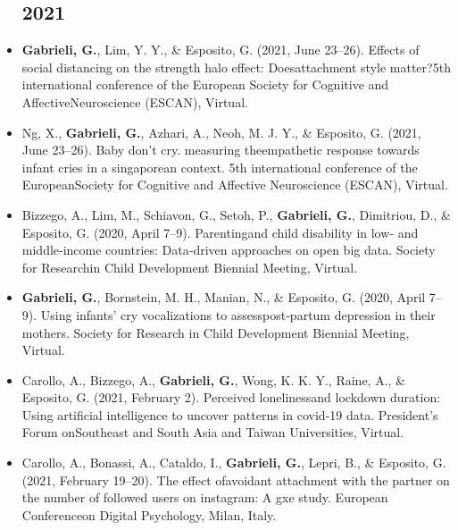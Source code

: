 \documentclass[10pt,a4paper]{altacv}
\begin{document}
\begin{fullwidth}
\begin{itemize}
\subsection*{2021}
\item  \textbf{Gabrieli, G.}, Lim, Y. Y., \& Esposito, G. (2021, June 23–26). Effects of social distancing on the strength halo effect: Doesattachment style matter?5th international conference of the European Society for Cognitive and AffectiveNeuroscience (ESCAN), Virtual.
 \item Ng, X., \textbf{Gabrieli, G.}, Azhari, A., Neoh, M. J. Y., \& Esposito, G. (2021, June 23–26). Baby don’t cry. measuring theempathetic response towards infant cries in a singaporean context. 5th international conference of the EuropeanSociety for Cognitive and Affective Neuroscience (ESCAN), Virtual.
 \item Bizzego, A., Lim, M., Schiavon, G., Setoh, P., \textbf{Gabrieli, G.}, Dimitriou, D., \& Esposito, G. (2020, April 7–9). Parentingand child disability in low‐ and middle‐income countries: Data‐driven approaches on open big data. Society for Researchin Child Development Biennial Meeting, Virtual.
 \item  \textbf{Gabrieli, G.}, Bornstein, M. H., Manian, N., \& Esposito, G. (2020, April 7–9). Using infants’ cry vocalizations to assesspost‐partum depression in their mothers. Society for Research in Child Development Biennial Meeting, Virtual.
 \item Carollo, A., Bizzego, A., \textbf{Gabrieli, G.}, Wong, K. K. Y., Raine, A., \& Esposito, G. (2021, February 2). Perceived lonelinessand lockdown duration: Using artificial intelligence to uncover patterns in covid‐19 data. President’s Forum onSoutheast and South Asia and Taiwan Universities, Virtual.
 \item Carollo, A., Bonassi, A., Cataldo, I., \textbf{Gabrieli, G.}, Lepri, B., \& Esposito, G. (2021, February 19–20). The effect ofavoidant attachment with the partner on the number of followed users on instagram: A gxe study. European Conferenceon Digital Psychology, Milan, Italy.
 

\end{itemize}
\end{fullwidth}
\end{document}
